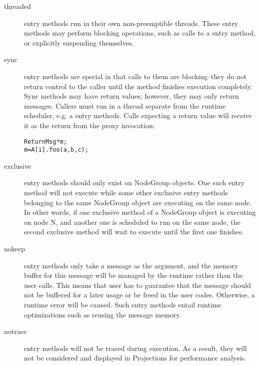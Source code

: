 \begin{description}
\item[threaded] entry methods 
run in their own non-preemptible threads. These
entry methods may perform blocking operations, such as calls to a
 entry method, or explicitly suspending themselves.

\item[sync] entry methods are special in that
calls to them are blocking--they do not return control to the caller until the
method finishes execution completely. Sync methods may have return values;
however, they may only return messages. Callers must run in a thread separate
from the runtime scheduler, e.g. a  entry methods.  Calls
expecting a return value will receive it as the return from the proxy
invocation:
\begin{alltt}
ReturnMsg* m;
m = A[i].foo(a, b, c);
\end{alltt}

\item[exclusive]  entry methods should
only exist on NodeGroup objects. One such entry method will not execute while
some other exclusive entry methods belonging to the same NodeGroup object are
executing on the same node. In other words, if one exclusive method of a
NodeGroup object is executing on node N, and another one is scheduled to run on
the same node, the second exclusive method will wait to execute until the first
one finishes.

\item[nokeep] entry methods only take a message as the argument,
and the memory buffer for this message will be managed by the \charmpp{}
runtime rather than the user calls. This means that user has to guarantee that
the message should not be buffered for a later usage or be freed in the user 
codes. Otherwise, a runtime error will be caused. 
Such entry methods entail runtime 
optimizations such as reusing the message memory.

\item[notrace] entry methods will not be traced during execution. As a result, they will not be considered and displayed in Projections for
performance analysis.


\end{description}
